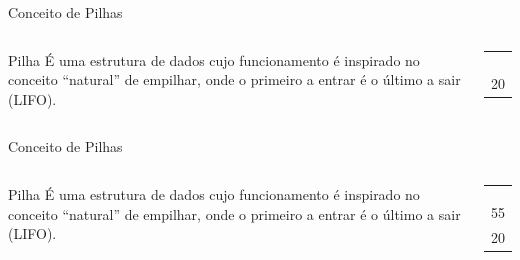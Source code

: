 \documentclass[12pt,table,xcolor={dvipsnames}]{beamer}
\begin{document}
\begin{frame}{Conceito de Pilhas}
\begin{columns}
\begin{block}{Pilha}
É uma estrutura de dados cujo funcionamento é inspirado no conceito “natural” de empilhar, onde o primeiro a entrar é o último a sair (LIFO).
\end{block}
\begin{center}
{
\begin{tabular}{ |p{.5cm}| }
\hline
 \\ \hline
 \\ \hline
 \\ \hline
 \\ \hline
 \\ \hline
20  \\ \hline
\end{tabular}
}
\end{center}
\end{columns}
\end{frame}

\begin{frame}{Conceito de Pilhas}
\begin{columns}
\begin{block}{Pilha}
É uma estrutura de dados cujo funcionamento é inspirado no conceito “natural” de empilhar, onde o primeiro a entrar é o último a sair (LIFO).
\end{block}
\begin{center}
{
\begin{tabular}{ |p{.5cm}| }
\hline
 \\ \hline
 \\ \hline
 \\ \hline
 \\ \hline
55 \\ \hline
20  \\ \hline
\end{tabular}
}
\end{center}
\end{columns}
\end{frame}
\end{document}
